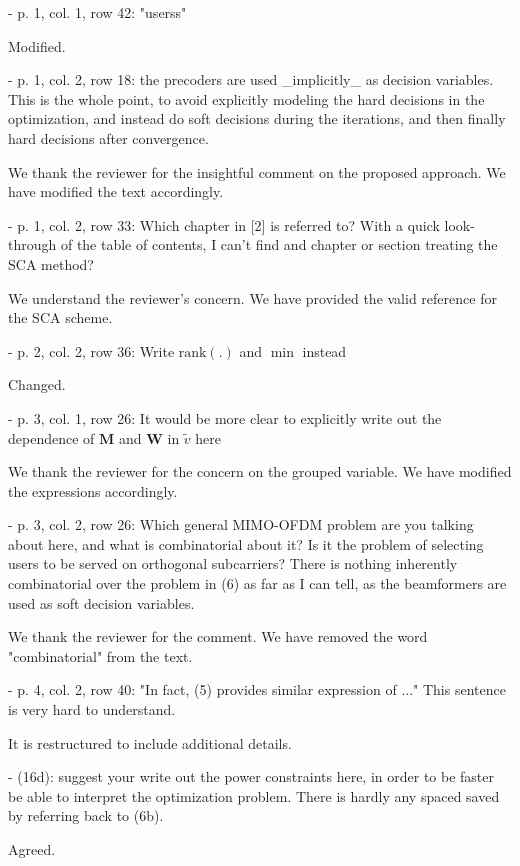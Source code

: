  - p. 1, col. 1, row 42: "userss"

\resp Modified.

 - p. 1, col. 2, row 18: the precoders are used \_implicitly\_ as decision variables. This is the whole point, to avoid explicitly modeling the hard decisions in the optimization, and instead do soft decisions during the iterations, and then finally hard decisions after convergence.

\resp We thank the reviewer for the insightful comment on the proposed approach. We have modified the text accordingly.

 - p. 1, col. 2, row 33: Which chapter in [2] is referred to? With a quick look-through of the table of contents, I can't find and chapter or section treating the SCA method?

\resp We understand the reviewer's concern. We have provided the valid reference for the SCA scheme.

 - p. 2, col. 2, row 36: Write $\text{rank}(.)$ and $\min$ instead

\resp Changed.

 - p. 3, col. 1, row 26: It would be more clear to explicitly write out the dependence of $\mathbf{M}$ and $\mathbf{W}$ in $\tilde{v}$ here

\resp We thank the reviewer for the concern on the grouped variable. We have modified the expressions accordingly.

 - p. 3, col. 2, row 26: Which general MIMO-OFDM problem are you talking about here, and what is combinatorial about it? Is it the problem of selecting users to be served on orthogonal subcarriers? There is nothing inherently combinatorial over the problem in (6) as far as I can tell, as the beamformers are used as soft decision variables.

\resp We thank the reviewer for the comment. We have removed the word "combinatorial" from the text. 

 - p. 4, col. 2, row 40: "In fact, (5) provides similar expression of ..." This sentence is very hard to understand.

\resp It is restructured to include additional details.

 - (16d): suggest your write out the power constraints here, in order to be faster be able to interpret the optimization problem. There is hardly any spaced saved by referring back to (6b).

\resp Agreed.

